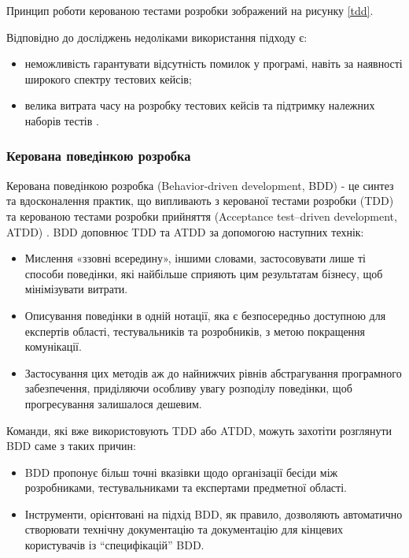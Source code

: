 Принцип роботи керованою тестами розробки зображений на рисунку \ref{tdd}.

Відповідно до досліджень недоліками використання підходу є:

\begin{itemize}
		\item неможливість гарантувати відсутність помилок у програмі,
			навіть за наявності широкого спектру тестових кейсів;
		\item велика витрата часу на розробку тестових кейсів
			та підтримку належних наборів тестів \cite{tdd-thesis}.
\end{itemize}


\subsubsection{Керована поведінкою розробка}

Керована поведінкою розробка (Behavior-driven development, BDD) 
- це синтез та вдосконалення практик, що випливають з
керованої тестами розробки (TDD) та керованою тестами розробки прийняття
(Acceptance test–driven development, ATDD) \cite{bdd-article}.
BDD доповнює TDD та ATDD за допомогою наступних технік:

\begin{itemize}
		\item Мислення «ззовні всередину», іншими словами, застосовувати
			лише ті способи поведінки, які найбільше сприяють цим результатам бізнесу,
			щоб мінімізувати витрати.
		\item Описування поведінки в одній нотації,
			яка є безпосередньо доступною для експертів області,
			тестувальників та розробників, з метою покращення комунікації.
		\item Застосування цих методів аж до найнижчих рівнів абстрагування
			програмного забезпечення, приділяючи особливу увагу розподілу поведінки,
			щоб прогресування залишалося дешевим.
\end{itemize}

Команди, які вже використовують TDD або ATDD, 
можуть захотіти розглянути BDD саме з таких причин:

\begin{itemize}
		\item BDD пропонує більш точні вказівки щодо організації бесіди між розробниками,
			тестувальниками та експертами предметної області.
		\item Інструменти, орієнтовані на підхід BDD, як правило,
			дозволяють автоматично створювати технічну документацію
			та документацію для кінцевих користувачів із “специфікацій” BDD.
\end{itemize}

